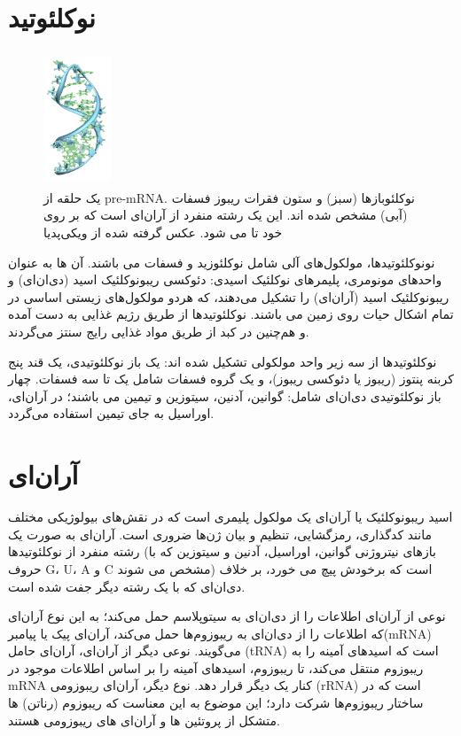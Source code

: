\documentclass[12pt,a4paper,BCOR=.7cm,headsepline,bibliography=totoc]{report}
\begin{document}
\section{نوکلئوتید}
\begin{figure}
\centering
\includegraphics[width=2cm, height=4cm]{pictures/Pre-mRNA-1ysv-tubes.png}
\caption{
یک حلقه از pre-mRNA. نوکلئوبازها (سبز) و ستون فقرات ریبوز فسفات (آبی) مشخص شده اند. این یک رشته منفرد از آر‌ان‌ای است که بر روی خود تا می شود. عکس گرفته شده از ویکی‌پدیا
}\label{wrap-fig:1}
\end{figure}
نونوکلئوتیدها، مولکول‌های آلی شامل نوکلئوزید و فسفات می باشند. آن ها به عنوان واحدهای مونومری، پلیمرهای نوکلئیک اسیدی: دئوکسی ریبونوکلئیک اسید (دی‌ان‌ای) و ریبونوکلئیک اسید (آر‌ان‌ای) را تشکیل می‌دهند، که هردو مولکول‌های زیستی اساسی در تمام اشکال حیات روی زمین می باشند. نوکلئوتیدها از طریق رژیم غذایی به دست آمده و هم‌چنین در کبد از طریق مواد غذایی رایج سنتز می‌گردند.\cite{Nucleotide}

نوکلئوتیدها از سه زیر واحد مولکولی تشکیل شده اند: یک باز نوکلئوتیدی، یک قند پنج کربنه پنتوز (ریبوز یا دئوکسی ریبوز)، و یک گروه فسفات شامل یک تا سه فسفات. چهار باز نوکلئوتیدی دی‌ان‌ای شامل: گوانین، آدنین، سیتوزین و تیمین می باشند؛ در آر‌ان‌ای، اوراسیل به جای تیمین استفاده می‌گردد.

\section{آر‌ان‌ای}

اسید ریبونوکلئیک یا آر‌ان‌ای
 یک مولکول پلیمری است که در نقش‌های بیولوژیکی مختلف مانند کدگذاری، رمزگشایی، تنظیم و بیان ژن‌ها ضروری است. آر‌ان‌ای به صورت یک رشته منفرد از نوکلئوتیدها (بازهای نیتروژنی گوانین، اوراسیل، آدنین و سیتوزین که با حروف G، U، A و C مشخص می شوند) است که برخودش پیچ می خورد، بر خلاف دی‌ان‌ای که با یک رشته دیگر جفت شده است.
 
نوعی از آر‌ان‌ای اطلاعات را از دی‌ان‌ای به سیتوپلاسم حمل می‌کند؛ به این نوع آر‌ان‌ای که اطلاعات را از دی‌ان‌ای به ریبوزوم‌ها حمل می‌کند، آر‌ان‌ای پیک یا پیامبر(mRNA) می‌گویند. نوعی دیگر از آر‌ان‌ای،
آر‌ان‌ای
 حامل (tRNA) است که اسیدهای آمینه را به ریبوزوم منتقل می‌کند، تا ریبوزوم، اسیدهای آمینه را بر اساس اطلاعات موجود در mRNA کنار یک دیگر قرار دهد. نوع دیگر، آر‌ان‌ای ریبوزومی (rRNA) است که در ساختار ریبوزوم‌ها شرکت دارد؛ این موضوع به این معناست که ریبوزوم (رناتن) ها متشکل از پروتئین ها و آر‌ان‌ای های ریبوزومی هستند.
\end{document}

